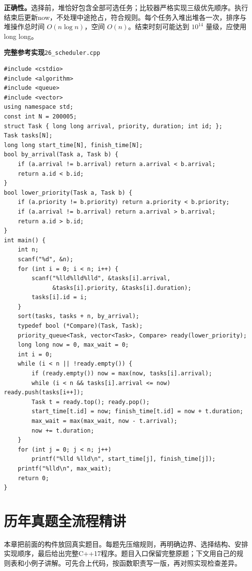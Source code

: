 \documentclass[UTF8,11pt,a4paper,fontset=none]{ctexart}
\begin{document}
\noindent\textbf{正确性。}选择前，堆恰好包含全部可选任务；比较器严格实现三级优先顺序。执行结束后更新now，不处理中途抢占，符合规则。每个任务入堆出堆各一次，排序与堆操作总时间 $O(n\log n)$，空间 $O(n)$。结束时刻可能达到 $10^{14}$ 量级，应使用long long。
\par\noindent\begin{minipage}{\linewidth}
\textbf{完整参考实现}\quad\texttt{26\_scheduler.cpp}
\begin{lstlisting}
#include <cstdio>
#include <algorithm>
#include <queue>
#include <vector>
using namespace std;
const int N = 200005;
struct Task { long long arrival, priority, duration; int id; };
Task tasks[N];
long long start_time[N], finish_time[N];
bool by_arrival(Task a, Task b) {
    if (a.arrival != b.arrival) return a.arrival < b.arrival;
    return a.id < b.id;
}
bool lower_priority(Task a, Task b) {
    if (a.priority != b.priority) return a.priority < b.priority;
    if (a.arrival != b.arrival) return a.arrival > b.arrival;
    return a.id > b.id;
}
int main() {
    int n;
    scanf("%d", &n);
    for (int i = 0; i < n; i++) {
        scanf("%lld%lld%lld", &tasks[i].arrival,
              &tasks[i].priority, &tasks[i].duration);
        tasks[i].id = i;
    }
    sort(tasks, tasks + n, by_arrival);
    typedef bool (*Compare)(Task, Task);
    priority_queue<Task, vector<Task>, Compare> ready(lower_priority);
    long long now = 0, max_wait = 0;
    int i = 0;
    while (i < n || !ready.empty()) {
        if (ready.empty()) now = max(now, tasks[i].arrival);
        while (i < n && tasks[i].arrival <= now) ready.push(tasks[i++]);
        Task t = ready.top(); ready.pop();
        start_time[t.id] = now; finish_time[t.id] = now + t.duration;
        max_wait = max(max_wait, now - t.arrival);
        now += t.duration;
    }
    for (int j = 0; j < n; j++)
        printf("%lld %lld\n", start_time[j], finish_time[j]);
    printf("%lld\n", max_wait);
    return 0;
}
\end{lstlisting}
\end{minipage}\par


\section{历年真题全流程精讲}
本章把前面的构件放回真实题目。每题先压缩规则，再明确边界、选择结构、安排实现顺序，最后给出完整C++17程序。题目入口保留完整原题；下文用自己的规则表和小例子讲解。可先合上代码，按函数职责写一版，再对照实现检查差异。
\end{document}
